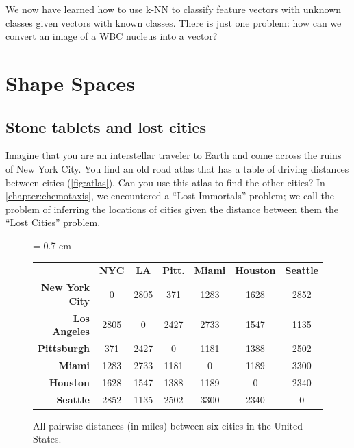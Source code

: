 We now have learned how to use k-NN to classify feature vectors with unknown classes given vectors with known classes. There is just one problem: how can we convert an image of a WBC nucleus into a vector?\\

\FloatBarrier
{}

\section{Shape Spaces}
\label{sec:shape_spaces}

\subsection{Stone tablets and lost cities}

Imagine that you are an interstellar traveler to Earth and come across the ruins of New York City. You find an old road atlas that has a table of driving distances between cities (\autoref{fig:atlas}). Can you use this atlas to find the other cities? In \autoref{chapter:chemotaxis}, we encountered a ``Lost Immortals'' problem; we call the problem of inferring the locations of cities given the distance between them the ``Lost Cities'' problem.\\

\begin{figure}[h]
\centering
\tabcolsep = 0.7 em
\mySfFamily
\small
{}
\begin{tabular}{r c c c c c c}
\rowcolor{gray!50}
& \textbf{NYC} & \textbf{LA} & \textbf{Pitt.} & \textbf{Miami} & \textbf{Houston} & \textbf{Seattle} \\
\textbf{New York City} & 0 & 2805 & 371 & 1283 & 1628 & 2852 \\
\textbf{Los Angeles} & 2805 & 0 & 2427 & 2733 & 1547 & 1135 \\
\textbf{Pittsburgh} & 371 & 2427 & 0 & 1181 & 1388 & 2502 \\
\textbf{Miami} & 1283 & 2733 & 1181 & 0 & 1189 & 3300 \\
\textbf{Houston} & 1628 & 1547 & 1388 & 1189 & 0 & 2340 \\
\textbf{Seattle} & 2852 & 1135 & 2502 & 3300 & 2340 & 0 \\
\end{tabular}
\caption{All pairwise distances (in miles) between six cities in the United States.}
\label{fig:atlas}
\end{figure}

